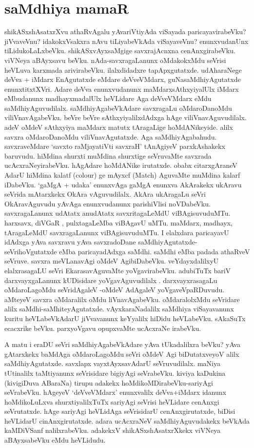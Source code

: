 \section*{saMdhiya mamaR}

shikASxshAsatxrXvu athaRvAgalu yAvariVtiyAda viSayada paricayavirabeVku? jiVvaveVnu? idakokxVsakxra nAvu tiLiyabeVkAda viSayaveVnu? enunxvudanUnx tiLidukoLaLxbeVku. shikASxvAyxsaMgige savxrajAcnxna cenAnxgirabeVku. viVNeya aBAyxsavu beVku. nAda-savxragaLanunx oMdakokxMdu seVrisi heVLuva karxmada arivirabeVku. ilalxdidadxre tapApxgutatxde. udAharaNege deVva + iMdarx  EnAgutatxde eMdare deVveVMdarx, guNasaMdhiyAgutatxde enunxtitxtXVri. Adare deVva enunxvudanunx maMdarxsAthxyiyalUlx iMdarx eMbudanunx madhayxmadalUlx  heVLidare Aga deVveVMdarx eMdu saMdhiyAguvudilalx. saMdhiyAgabeVkAdare savxragaLu oMdaroDanoMdu viliVnavAgabeVku. beVre beVre sAthxyiyalilxdAdxga hAge viliVnavAguvudilalx. adeV oMdeV sAthxyiya maMdarx matutx tAragaLige hoMdANikeyide. alilx savxra oMdaroDanoMdu viliVnavAgutatxde. Aga saMdhiyAgabahudu. savxraveMdare `savxto raMjayatiVti savxraH'\label{11} tAnAgiyeV parxkAshakekx baruvudu. hiMdina shurxti muMdina shurxtige seVruvaMte savxrada ucAcxraNeyirabeVku. hAgAdare hoMdANike irutatxde. obabx citarxgAraneV AdarU hiMdina kalatf {(\eng colour)} ge mAyxcf {(\eng Match)} AguvaMte muMdina kalarf iDabeVku. `gaMgA + udaka' enunxvAga gaMgA enunxva AkArakekx  ukAravu seVrida mAtarxkekx  OkAra vAguvudilalx. AkAra ukAragaLu seVri OkAravAguvudu yAvAga enunxvudanunx parishiVlisi noVDabeVku. savxragaLanunx udAtatx anudAtatx savxritagaLeMdU viBAgisuvuduMTu. harxsavx, diVGaR , pulxtagaLeMba viBAgavU uMTu. maMdarx, madhayx, tAragaLeMdU savxragaLanunx  viBAgisuvuduMTu. I elalxdara paricayavU idAdxga yAva savxravu yAva savxradoDane saMdhiyAgutatxde- seVrihoVgutatxde eMba paricayadAdxga saMdhi. saMdhi eMba padada athaRveV seVruve. savxra meVLanavAgi oMdeV AgibiDabeVku. veYdayxdalilxyU elalxrasagaLU seVri  EkarasavAguvaMte yoVgavirabeVku. adubiTuTx bariV darxvayxgaLanunx kUDisidare yoVgavAguvudilalx .  darxvayxrasagaLu oMdaroLagoMdu seVridAgaleV -oMdeV AdAgaleV yoVgaveVpaRDuvudu. aMteyeV savxra oMdaralilx oMdu liVnavAgabeVku. oMdaralolxMdu seVridare alilx saMdhi-saMhiteyAgutatxde. vAyxkaraNadalilx saMdhiya viSayavanunx kuritu heVLabeVkAdarU jiVvavanunx keYyalilx hiDidu heVLabeVku. sAkaSuTx ecacxrike beVku. parxyoVgavu opupxvaMte ucAcxraNe irabeVku.

A matu i eraDU seVri saMdhiyAgabeVkAdare yAva tUkadalilxra beVku? yAva gAtarxkekx  baMdAga oMdaroLagoMdu seVri oMdeV Agi biDutatxveyoV alilx saMdhiyAgutatxde. savxlapx  vayxtAyxsavAdarU seVruvudilalx. maNiya tUtinalilx  taMtiyanunx  seVrisidare bigiyAgi seVrabeVku. kiviya kaDukina (kivigiDuva ABaraNa) tirupu adakekx  hoMdikoMDirabeVku-sariyAgi seVrabeVku. hAgeyeV `deVveVMdarx' enunxvalilx deVva+iMdarx idanunx  hoMdikoLuLxva shurxtiyalilxTuTx sariyAgi seVrisi heVLidare cenAnxgi seVrutatxde. hAge sariyAgi heVLidAga seVrisidarU cenAnxgirutatxde, biDisi heVLidarU cinAnxgirutatxde. adara ucAcxraNeV saMdhiyAguvudakekx beVkAda kaMDiVSanf nalilxrabeVku. adakekxV shikASxshAsatxrXkekx viVNeya aBAyxsabeVku eMdu heVLidudu.

